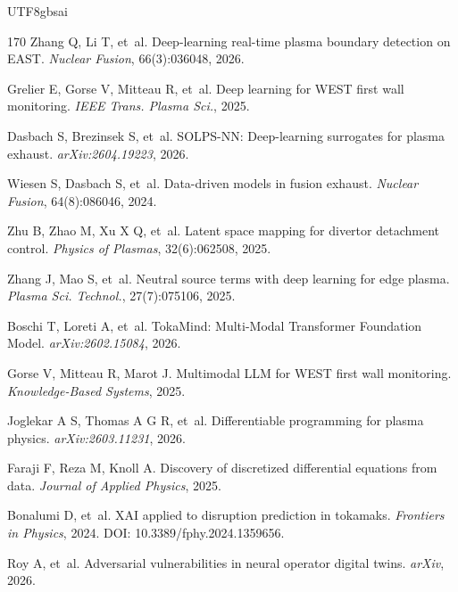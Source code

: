\documentclass[12pt,a4paper]{article}
\begin{document}
\begin{CJK}{UTF8}{gbsai}
\begin{thebibliography}{170}
Zhang Q, Li T, et~al.
\newblock Deep-learning real-time plasma boundary detection on EAST.
\newblock \textit{Nuclear Fusion}, 66(3):036048, 2026.

Grelier E, Gorse V, Mitteau R, et~al.
\newblock Deep learning for WEST first wall monitoring.
\newblock \textit{IEEE Trans. Plasma Sci.}, 2025.

Dasbach S, Brezinsek S, et~al.
\newblock SOLPS-NN: Deep-learning surrogates for plasma exhaust.
\newblock \textit{arXiv:2604.19223}, 2026.

Wiesen S, Dasbach S, et~al.
\newblock Data-driven models in fusion exhaust.
\newblock \textit{Nuclear Fusion}, 64(8):086046, 2024.

Zhu B, Zhao M, Xu X Q, et~al.
\newblock Latent space mapping for divertor detachment control.
\newblock \textit{Physics of Plasmas}, 32(6):062508, 2025.

Zhang J, Mao S, et~al.
\newblock Neutral source terms with deep learning for edge plasma.
\newblock \textit{Plasma Sci. Technol.}, 27(7):075106, 2025.

Boschi T, Loreti A, et~al.
\newblock TokaMind: Multi-Modal Transformer Foundation Model.
\newblock \textit{arXiv:2602.15084}, 2026.

Gorse V, Mitteau R, Marot J.
\newblock Multimodal LLM for WEST first wall monitoring.
\newblock \textit{Knowledge-Based Systems}, 2025.

Joglekar A S, Thomas A G R, et~al.
\newblock Differentiable programming for plasma physics.
\newblock \textit{arXiv:2603.11231}, 2026.

Faraji F, Reza M, Knoll A.
\newblock Discovery of discretized differential equations from data.
\newblock \textit{Journal of Applied Physics}, 2025.

Bonalumi D, et~al.
\newblock XAI applied to disruption prediction in tokamaks.
\newblock \textit{Frontiers in Physics}, 2024. DOI: 10.3389/fphy.2024.1359656.

Roy A, et~al.
\newblock Adversarial vulnerabilities in neural operator digital twins.
\newblock \textit{arXiv}, 2026.


\end{thebibliography}
\end{CJK}
\end{document}
